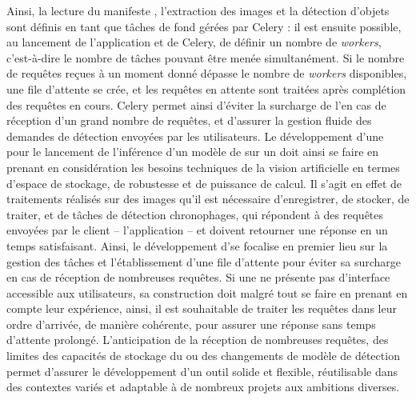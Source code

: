 	Ainsi, la lecture du manifeste \iiif, l'extraction des images et la détection d'objets sont définis en tant que tâches de fond gérées par Celery : il est ensuite possible, au lancement de l'application et de Celery, de définir un nombre de \textit{workers}, c'est-à-dire le nombre de tâches pouvant être menée simultanément. Si le nombre de requêtes reçues à un moment donné dépasse le nombre de \textit{workers} disponibles, une file d'attente se crée, et les requêtes en attente sont traitées après complétion des requêtes en cours. Celery permet ainsi d'éviter la surcharge de l'\api en cas de réception d'un grand nombre de requêtes, et d'assurer la gestion fluide des demandes de détection envoyées par les utilisateurs.
	Le développement d'une \api pour le lancement de l'inférence d'un modèle de \dl sur un \gpu doit ainsi se faire en prenant en considération les besoins techniques de la vision artificielle en termes d'espace de stockage, de robustesse et de puissance de calcul. Il s'agit en effet de traitements réalisés sur des images qu'il est nécessaire d'enregistrer, de stocker, de traiter, et de tâches de détection chronophages, qui répondent à des requêtes envoyées par le client -- l'application -- et doivent retourner une réponse en un temps satisfaisant. Ainsi, le développement d'\exapi se focalise en premier lieu sur la gestion des tâches et l'établissement d'une file d'attente pour éviter sa surcharge en cas de réception de nombreuses requêtes. Si une \api ne présente pas d'interface accessible aux utilisateurs, sa construction doit malgré tout se faire en prenant en compte leur expérience, ainsi, il est souhaitable de traiter les requêtes dans leur ordre d'arrivée, de manière cohérente, pour assurer une réponse sans temps d'attente prolongé. L'anticipation de la réception de nombreuses requêtes, des limites des capacités de stockage du \gpu ou des changements de modèle de détection permet d'assurer le développement d'un outil solide et flexible, réutilisable dans des contextes variés et adaptable à de nombreux projets aux ambitions diverses.